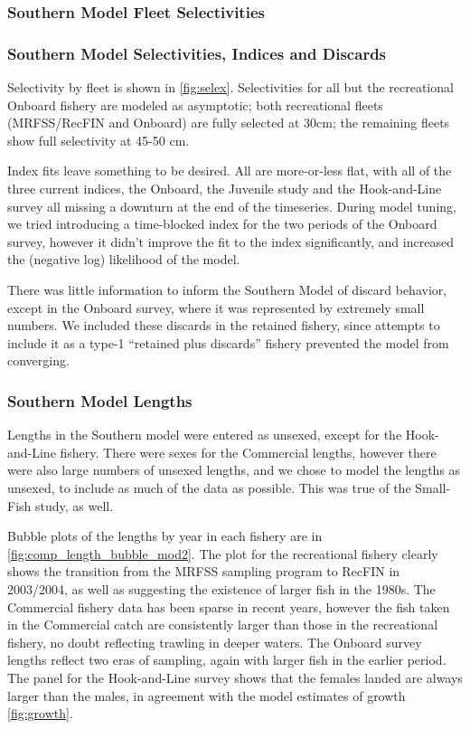 \documentclass[12pt,]{article}
\begin{document}
\subsubsection{Southern Model Fleet
Selectivities}\label{southern-model-fleet-selectivities}

\subsubsection{Southern Model Selectivities, Indices and
Discards}\label{southern-model-selectivities-indices-and-discards}

Selectivity by fleet is shown in \ref{fig:selex}. Selectivities for all
but the recreational Onboard fishery are modeled as asymptotic; both
recreational fleets (MRFSS/RecFIN and Onboard) are fully selected at
30cm; the remaining fleets show full selectivity at 45-50 cm.

Index fits leave something to be desired. All are more-or-less flat,
with all of the three current indices, the Onboard, the Juvenile study
and the Hook-and-Line survey all missing a downturn at the end of the
timeseries. During model tuning, we tried introducing a time-blocked
index for the two periods of the Onboard survey, however it didn't
improve the fit to the index significantly, and increased the (negative
log) likelihood of the model.

There was little information to inform the Southern Model of discard
behavior, except in the Onboard survey, where it was represented by
extremely small numbers. We included these discards in the retained
fishery, since attempts to include it as a type-1 ``retained plus
discards'' fishery prevented the model from converging.

\subsubsection{Southern Model Lengths}\label{southern-model-lengths}

Lengths in the Southern model were entered as unsexed, except for the
Hook-and-Line fishery. There were sexes for the Commercial lengths,
however there were also large numbers of unsexed lengths, and we chose
to model the lengths as unsexed, to include as much of the data as
possible. This was true of the Small-Fish study, as well.

Bubble plots of the lengths by year in each fishery are in
\ref{fig:comp_length_bubble_mod2}. The plot for the recreational fishery
clearly shows the transition from the MRFSS sampling program to RecFIN
in 2003/2004, as well as suggesting the existence of larger fish in the
1980s. The Commercial fishery data has been sparse in recent years,
however the fish taken in the Commercial catch are consistently larger
than those in the recreational fishery, no doubt reflecting trawling in
deeper waters. The Onboard survey lengths reflect two eras of sampling,
again with larger fish in the earlier period. The panel for the
Hook-and-Line survey shows that the females landed are always larger
than the males, in agreement with the model estimates of growth
\ref{fig:growth}.
\end{document}
